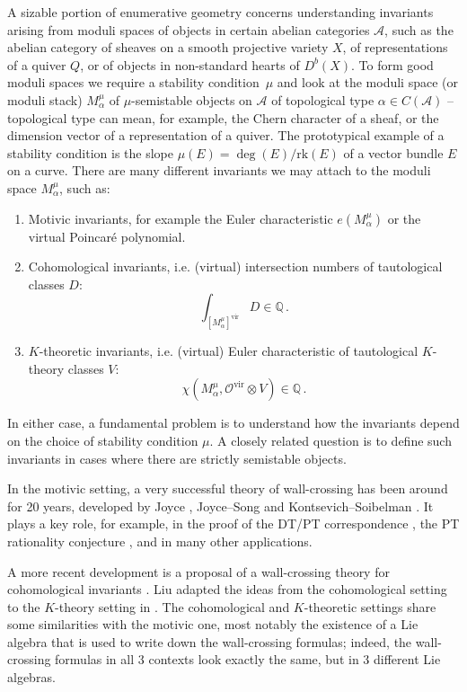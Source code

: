 \documentclass[12pt]{amsart}
\theoremstyle{definition}
\newcommand{\BQ}{{\mathbb{Q}}}
\newcommand{\CA}{{\mathcal A}}
\newcommand{\CO}{{\mathcal O}}
\newcommand{\1}{\mathbf 1}
\newcommand{\vir}{\mathrm{vir}}
\newcommand{\rk}{\mathrm{rk}}
\begin{document}
A sizable portion of enumerative geometry concerns understanding invariants arising from moduli spaces of objects in certain abelian categories $\CA$, such as the abelian category of sheaves on a smooth projective variety $X$, of representations of a quiver $Q$, or of objects in non-standard hearts of $D^b(X)$. To form good moduli spaces we require a stability condition~$\mu$ and look at the moduli space (or moduli stack) $M_\alpha^\mu$ of $\mu$-semistable objects on $\CA$ of topological type $\alpha\in C(\CA)$ -- topological type can mean, for example, the Chern character of a sheaf, or the dimension vector of a representation of a quiver. The prototypical example of a stability condition is the slope $\mu(E)=\deg(E)/\rk(E)$ of a vector bundle $E$ on a curve. There are many different invariants we may attach to the moduli space $M_\alpha^\mu$, such as:
\begin{enumerate}
    \item Motivic invariants, for example the Euler characteristic $e(M_\alpha^\mu)$ or the virtual Poincaré polynomial. 
    \item Cohomological invariants, i.e. (virtual) intersection numbers of tautological classes $D$:
    \[\int_{[M_\alpha^\mu]^\vir}D\in \BQ\,.\]
    \item $K$-theoretic invariants, i.e. (virtual) Euler characteristic of tautological $K$-theory classes $V$:
    \[\chi(M_\alpha^\mu, \CO^\vir\otimes V)\in \BQ\,.\]
\end{enumerate}

In either case, a fundamental problem is to understand how the invariants depend on the choice of stability condition $\mu$. A closely related question is to define such invariants in cases where there are strictly semistable objects. 

In the motivic setting, a very successful theory of wall-crossing has been around for 20 years, developed by Joyce \cite{JO06I, JO06II, JO06III, JO06IV}, Joyce--Song \cite{JS12} and Kontsevich--Soibelman \cite{KS08}. It plays a key role, for example, in the proof of the DT/PT correspondence \cite{todaDTPT, bridgelandDTPT}, the PT rationality conjecture \cite{todaPTrationality}, and in many other applications.

A more recent development is a proposal of a wall-crossing theory for cohomological invariants \cite{Jo17, joyce, GJT}. Liu adapted the ideas from the cohomological setting to the $K$-theory setting in \cite{Liu}. The cohomological and $K$-theoretic settings share some similarities with the motivic one, most notably the existence of a Lie algebra that is used to write down the wall-crossing formulas; indeed, the wall-crossing formulas in all 3 contexts look exactly the same, but in 3 different Lie algebras. 
\end{document}
